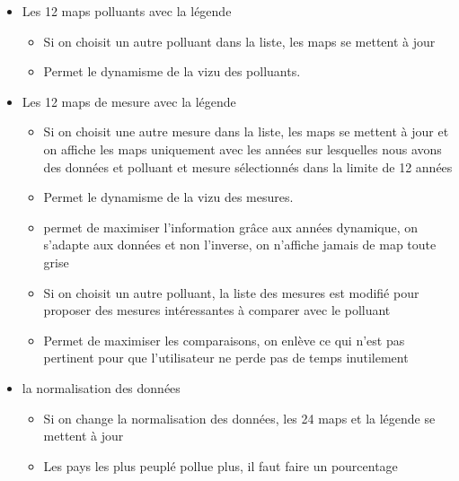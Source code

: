 \documentclass[preprint,journal]{vgtc}       %
\begin{document}
	\begin{itemize}
		\item Les 12 maps polluants avec la légende
			\begin{itemize}
				\item Si on choisit un autre polluant dans la liste, les maps se mettent à jour
				\item Permet le dynamisme de la vizu des polluants.
			\end{itemize}
			
		\item Les 12 maps de mesure avec la légende
			\begin{itemize}
				\item Si on choisit une autre mesure dans la liste, les maps se mettent à jour et on affiche les maps uniquement avec les années sur lesquelles nous avons des données et polluant et mesure sélectionnés dans la limite de 12 années
				\item Permet le dynamisme de la vizu des mesures.
				\item permet de maximiser l’information grâce aux années dynamique, on s’adapte aux données et non l’inverse, on n’affiche jamais de map toute grise
				\item Si on choisit un autre polluant, la liste des mesures est modifié pour proposer des mesures intéressantes à comparer avec le polluant
				\item Permet de maximiser les comparaisons, on enlève ce qui n’est pas pertinent pour que l’utilisateur ne perde pas de temps inutilement
			\end{itemize}

		\item la normalisation des données
			\begin{itemize}
				\item Si on change la normalisation des données, les 24 maps et la légende se mettent à jour
				\item Les pays les plus peuplé pollue plus, il faut faire un pourcentage
			\end{itemize}
		

\end{itemize}
\end{document}
